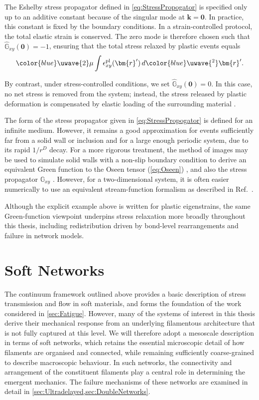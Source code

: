 \documentclass[asymmetricmargins]{library/duthesis}%
\providecommand{\DIFadd}[1]{{\protect\color{blue}\uwave{#1}}} %
\providecommand{\DIFaddbegin}{} %
\providecommand{\DIFaddend}{} %
\begin{document}
The Eshelby stress propagator defined in \cref{eq:StressPropogator} is specified only up to an additive constant because of the singular mode at $\bm{k}=\bm{0}$. In practice, this constant is fixed by the boundary conditions. In a strain-controlled protocol, the total elastic strain is conserved. The zero mode is therefore chosen such that $\hat{\mathbb{G}}_{xy}(\bm{0}) = -1$, ensuring that the total stress relaxed by plastic events equals
\[
    \DIFaddbegin \DIFadd{2}\DIFaddend \mu\int \epsilon_{xy}^{\mathrm{pl}}(\bm{r}^\prime) \, d\DIFaddbegin \DIFadd{^2}\DIFaddend \bm{r}^\prime.
\]

By contrast, under stress-controlled conditions, we set $\hat{\mathbb{G}}_{xy}(\bm{0}) = 0$. In this case, no net stress is removed from the system; instead, the stress released by plastic deformation is compensated by elastic loading of the surrounding material \cite{nicolas_deformation_2018,martens_spontaneous_2012,jocteur_protocol_2025,lin_scaling_2014}.

The form of the stress propagator given in \cref{eq:StressPropogator} is defined for an infinite medium. However, it remains a good approximation for events sufficiently far from a solid wall or inclusion and for a large enough periodic system, due to its rapid $1/r^{D}$ decay. For a more rigorous treatment, the method of images may be used to simulate solid walls with a non-slip boundary condition to derive an equivalent Green function to the Oseen tensor (\cref{eq:Oseen}) \cite{blake_note_1971}, and also the stress propagator $\mathbb{G}_{xy}$ \cite{picard_elastic_2004}. However, for a two-dimensional system, it is often easier numerically to use an equivalent stream-function formalism as described in Ref.~\cite{acheson_elementary_1990}.

Although the explicit example above is written for plastic eigenstrains, the same Green-function viewpoint underpins stress relaxation more broadly throughout this thesis, including redistribution driven by bond-level rearrangements and failure in network models.

\section{Soft Networks} \label{sec:Networks}

The continuum framework outlined above provides a basic description of stress transmission and flow in soft materials, and forms the foundation of the work considered in \cref{sec:Fatigue}. However, many of the systems of interest in this thesis derive their mechanical response from an underlying filamentous architecture that is not fully captured at this level. We will therefore adopt a mesoscale description in terms of soft networks, which retains the essential microscopic detail of how filaments are organised and connected, while remaining sufficiently coarse-grained to describe macroscopic behaviour. In such networks, the connectivity and arrangement of the constituent filaments play a central role in determining the emergent mechanics. The failure mechanisms of these networks are examined in detail in \cref{sec:Ultradelayed,sec:DoubleNetworks}.
\end{document}
